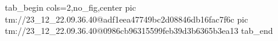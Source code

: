  
 
 
 
 

\qqSecOrig


\ifcmt
  tab_begin cols=2,no_fig,center
    pic tm://23_12_22.09.36.40@adf1eea47749bc2d08846db16fac7f6c
    pic tm://23_12_22.09.36.40@0986cb96315599feb39d3b6365b3ea13
  tab_end
\fi

